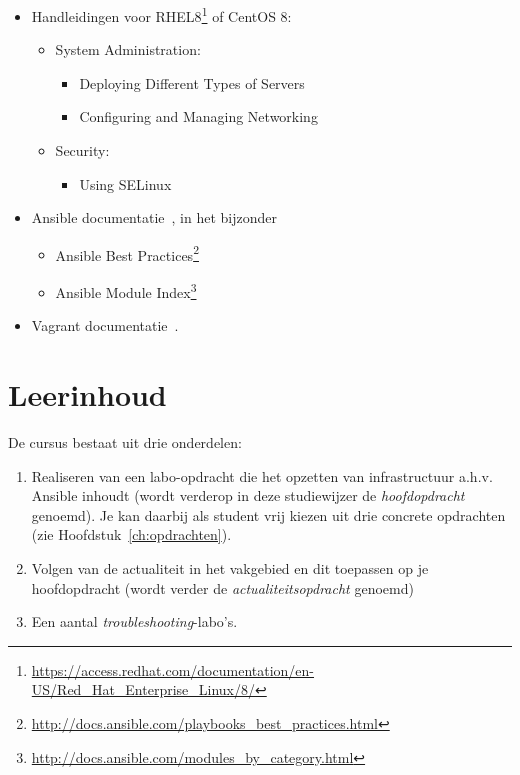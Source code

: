 \begin{itemize}
  \item Handleidingen voor RHEL8\footnote{\url{https://access.redhat.com/documentation/en-US/Red_Hat_Enterprise_Linux/8/}} of CentOS 8:
  \begin{itemize}
    \item System Administration:
    \begin{itemize}
      \item Deploying Different Types of Servers
      \item Configuring and Managing Networking
    \end{itemize}
    \item Security:
    \begin{itemize}
      \item Using SELinux
    \end{itemize}
  \end{itemize}
  \item Ansible documentatie~\autocite{Ansible2016}, in het bijzonder
  
  \begin{itemize}
    \item Ansible Best Practices\footnote{\url{http://docs.ansible.com/playbooks_best_practices.html}}
    \item Ansible Module Index\footnote{\url{http://docs.ansible.com/modules_by_category.html}}
  \end{itemize}
  \item Vagrant documentatie~\autocite{Hashicorp}.
\end{itemize}

\section{Leerinhoud}%
\label{sec:leerinhoud}

De cursus bestaat uit drie onderdelen:

\begin{enumerate}
  \item Realiseren van een labo-opdracht die het opzetten van infrastructuur a.h.v. Ansible inhoudt (wordt verderop in deze studiewijzer de \emph{hoofdopdracht} genoemd). Je kan daarbij als student vrij kiezen uit drie concrete opdrachten (zie Hoofdstuk~\ref{ch:opdrachten}).
  \item Volgen van de actualiteit in het vakgebied en dit toepassen op je hoofdopdracht (wordt verder de \emph{actualiteitsopdracht} genoemd)
  \item Een aantal \emph{troubleshooting}-labo's.
\end{enumerate}

